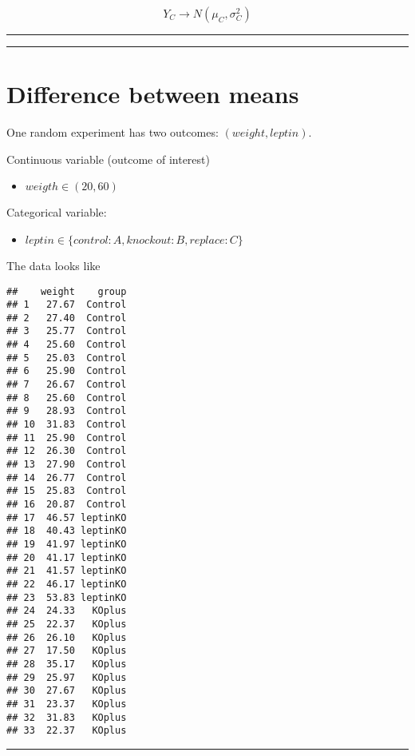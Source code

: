 \documentclass[
]{book}
\providecommand{\tightlist}{%
  \setlength{\itemsep}{0pt}\setlength{\parskip}{0pt}}
\begin{document}
\[Y_C \rightarrow N(\mu_C, \sigma_C^2)\]

\begin{center}\rule{0.5\linewidth}{0.5pt}\end{center}

\begin{center}\rule{0.5\linewidth}{0.5pt}\end{center}

\hypertarget{difference-between-means-8}{%
\section{Difference between means}\label{difference-between-means-8}}

One random experiment has two outcomes: \((weight, leptin)\).

Continuous variable (outcome of interest)

\begin{itemize}
\tightlist
\item
  \(weigth \in (20, 60)\)
\end{itemize}

Categorical variable:

\begin{itemize}
\tightlist
\item
  \(leptin \in \{control:A,knockout:B, replace:C\}\)
\end{itemize}

The data looks like

\begin{verbatim}
##    weight    group
## 1   27.67  Control
## 2   27.40  Control
## 3   25.77  Control
## 4   25.60  Control
## 5   25.03  Control
## 6   25.90  Control
## 7   26.67  Control
## 8   25.60  Control
## 9   28.93  Control
## 10  31.83  Control
## 11  25.90  Control
## 12  26.30  Control
## 13  27.90  Control
## 14  26.77  Control
## 15  25.83  Control
## 16  20.87  Control
## 17  46.57 leptinKO
## 18  40.43 leptinKO
## 19  41.97 leptinKO
## 20  41.17 leptinKO
## 21  41.57 leptinKO
## 22  46.17 leptinKO
## 23  53.83 leptinKO
## 24  24.33   KOplus
## 25  22.37   KOplus
## 26  26.10   KOplus
## 27  17.50   KOplus
## 28  35.17   KOplus
## 29  25.97   KOplus
## 30  27.67   KOplus
## 31  23.37   KOplus
## 32  31.83   KOplus
## 33  22.37   KOplus
\end{verbatim}

\begin{center}\rule{0.5\linewidth}{0.5pt}\end{center}
\end{document}
